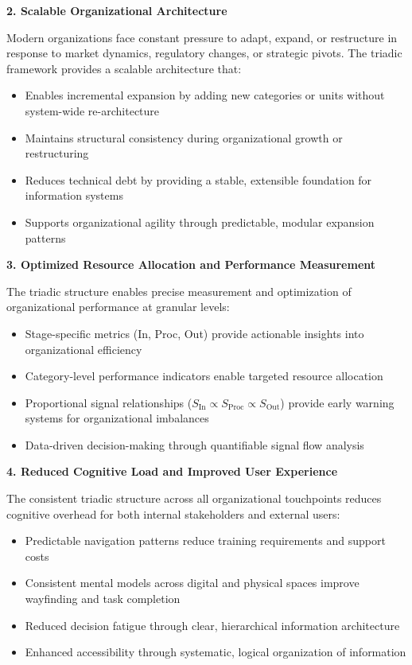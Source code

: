 \documentclass[11pt,a4paper]{article}
\begin{document}
\textbf{2. Scalable Organizational Architecture}

Modern organizations face constant pressure to adapt, expand, or restructure in response to market dynamics, regulatory changes, or strategic pivots. The triadic framework provides a scalable architecture that:
\begin{itemize}[noitemsep]
  \item Enables incremental expansion by adding new categories or units without system-wide re-architecture
  \item Maintains structural consistency during organizational growth or restructuring
  \item Reduces technical debt by providing a stable, extensible foundation for information systems
  \item Supports organizational agility through predictable, modular expansion patterns
\end{itemize}

\textbf{3. Optimized Resource Allocation and Performance Measurement}

The triadic structure enables precise measurement and optimization of organizational performance at granular levels:
\begin{itemize}[noitemsep]
  \item Stage-specific metrics (In, Proc, Out) provide actionable insights into organizational efficiency
  \item Category-level performance indicators enable targeted resource allocation
  \item Proportional signal relationships (\(S_{\text{In}} \propto S_{\text{Proc}} \propto S_{\text{Out}}\)) provide early warning systems for organizational imbalances
  \item Data-driven decision-making through quantifiable signal flow analysis
\end{itemize}

\textbf{4. Reduced Cognitive Load and Improved User Experience}

The consistent triadic structure across all organizational touchpoints reduces cognitive overhead for both internal stakeholders and external users:
\begin{itemize}[noitemsep]
  \item Predictable navigation patterns reduce training requirements and support costs
  \item Consistent mental models across digital and physical spaces improve wayfinding and task completion
  \item Reduced decision fatigue through clear, hierarchical information architecture
  \item Enhanced accessibility through systematic, logical organization of information
\end{itemize}
\end{document}
